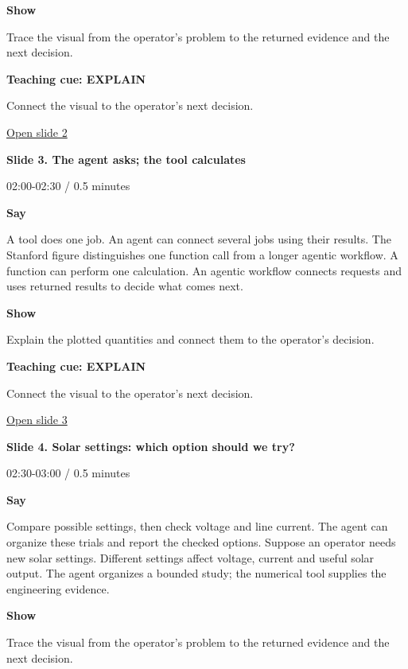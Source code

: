 \documentclass[12pt,letterpaper]{article}
\begin{document}
\textbf{Show}\par Trace the visual from the operator's problem to the returned evidence and the next decision.\par\medskip
\textbf{Teaching cue: EXPLAIN}\par Connect the visual to the operator's next decision.\par\medskip
\vfill\href{https://alaaselim-sudo.github.io/GridGuard-Agentic-AI-Tutorials/operator-cases/#/2}{Open slide 2}\par
\clearpage{}
{\Large\bfseries\color{IEEEBlue} Slide 3. The agent asks; the tool calculates\par}\medskip
{\small\color{Slate} 02:00-02:30 /\allowbreak{} 0.5 minutes\par}\medskip
\textbf{Say}\par A tool does one job. An agent can connect several jobs using their results. The Stanford figure distinguishes one function call from a longer agentic workflow. A function can perform one calculation. An agentic workflow connects requests and uses returned results to decide what comes next.\par\medskip
\textbf{Show}\par Explain the plotted quantities and connect them to the operator's decision.\par\medskip
\textbf{Teaching cue: EXPLAIN}\par Connect the visual to the operator's next decision.\par\medskip
\vfill\href{https://alaaselim-sudo.github.io/GridGuard-Agentic-AI-Tutorials/operator-cases/#/3}{Open slide 3}\par
\clearpage{}
{\Large\bfseries\color{IEEEBlue} Slide 4. Solar settings: which option should we try?\par}\medskip
{\small\color{Slate} 02:30-03:00 /\allowbreak{} 0.5 minutes\par}\medskip
\textbf{Say}\par Compare possible settings, then check voltage and line current. The agent can organize these trials and report the checked options. Suppose an operator needs new solar settings. Different settings affect voltage, current and useful solar output. The agent organizes a bounded study; the numerical tool supplies the engineering evidence.\par\medskip
\textbf{Show}\par Trace the visual from the operator's problem to the returned evidence and the next decision.\par\medskip
\end{document}
